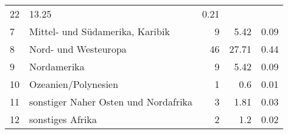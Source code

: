 \begin{longtable}{lXrrr}
       \num{22} &
       \num[round-mode=places,round-precision=2]{13.25} &
         \num[round-mode=places,round-precision=2]{0.21} \\

     7 &
     \multicolumn{1}{X}{ Mittel- und Südamerika, Karibik   } &


       \num{9} &
       \num[round-mode=places,round-precision=2]{5.42} &
         \num[round-mode=places,round-precision=2]{0.09} \\

     8 &
     \multicolumn{1}{X}{ Nord- und Westeuropa   } &


       \num{46} &
       \num[round-mode=places,round-precision=2]{27.71} &
         \num[round-mode=places,round-precision=2]{0.44} \\

     9 &
     \multicolumn{1}{X}{ Nordamerika   } &


       \num{9} &
       \num[round-mode=places,round-precision=2]{5.42} &
         \num[round-mode=places,round-precision=2]{0.09} \\

     10 &
     \multicolumn{1}{X}{ Ozeanien/Polynesien   } &


       \num{1} &
       \num[round-mode=places,round-precision=2]{0.6} &
         \num[round-mode=places,round-precision=2]{0.01} \\

     11 &
     \multicolumn{1}{X}{ sonstiger Naher Osten und Nordafrika   } &


       \num{3} &
       \num[round-mode=places,round-precision=2]{1.81} &
         \num[round-mode=places,round-precision=2]{0.03} \\

     12 &
     \multicolumn{1}{X}{ sonstiges Afrika   } &


       \num{2} &
       \num[round-mode=places,round-precision=2]{1.2} &
         \num[round-mode=places,round-precision=2]{0.02} \\


\end{longtable}
